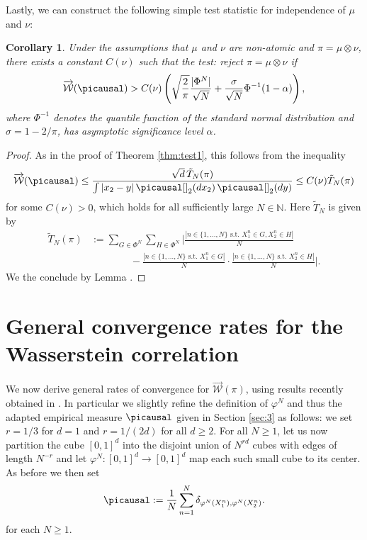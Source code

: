 \documentclass[10pt]{amsart}
\newtheorem{corollary}[theorem]{Corollary}
\newcommand{\N}{\mathbb{N}}
\begin{document}
Lastly, we can construct the following simple test statistic for independence of $\mu$ and $\nu$:

\begin{corollary}\label{cor:go}
Under the assumptions that $\mu$ and $\nu$ are non-atomic and $\pi=\mu\otimes\nu$, there exists a constant $C(\nu)$ such that the test: reject $\pi=\mu\otimes \nu$ if 
\begin{align*}
\overrightarrow{\mathcal{W}}(\picausal)> C(\nu)\left( \sqrt{\frac{2}{\pi}} \frac{|\Phi^N|}{\sqrt{N}}+\frac{\sigma}{\sqrt{N}} \Phi^{-1}(1-\alpha)\right),
\end{align*}
where $\Phi^{-1}$ denotes the quantile function of the standard normal distribution and $\sigma=1-2/\pi$, has asymptotic significance level $\alpha$.
\end{corollary}

\begin{proof}
As in the proof of Theorem \ref{thm:test1}, this follows from the inequality
\begin{align*}
\overrightarrow{\mathcal{W}}(\picausal)\le \frac{\sqrt{d}\, \tilde{T}_N(\pi)}{ \int |x_2-y|\,\picausal[]_2(dx_2)\,\picausal[]_2(dy)}\le C(\nu) \tilde{T}_N(\pi)
\end{align*}
for some $C(\nu)>0$, which holds for all sufficiently large $N\in \N$. Here $\tilde{T}_N$ is given by 
\begin{align*}
\tilde{T}_N(\pi)&:=
\sum_{G\in \Phi^N} \sum_{H\in\Phi^N} \Bigg|\frac{|n\in \{1,\dots, N\} \text{ s.t. } X_1^n\in G, X_2^n\in H|}{N}\\
&\qquad\qquad- \frac{|n\in \{1, \dots, N\} \text{ s.t. } X_1^n\in G|}{N}\cdot \frac{|n\in \{1,\dots, N\} \text{ s.t. } X_2^n\in H|}{N}\Bigg|.
\end{align*}
We the conclude by Lemma \cite[Lemma 1.1]{jwb}. 
\end{proof}

\section{General convergence rates for the Wasserstein correlation}\label{sec:5}

We now derive general rates of convergence for $\overrightarrow{\mathcal{W}}(\pi)$, using results recently obtained in \cite{backhoff2020estimating}. In particular we slightly refine the definition of $\varphi^N$ and thus the adapted empirical measure $\picausal$ given in Section \ref{sec:3} as follows: we set $r=1/3$ for $d=1$ and $r=1/(2d)$ for all $d\geq 2$.
	For all $N\geq 1$, let us  now partition the cube $[0,1]^d$ into the disjoint union of $N^{rd}$ cubes with edges of length $N^{-r}$ and let $\varphi^N\colon[0,1]^d\to[0,1]^d$ map each such small cube to its center. As before we then set
	\[ \picausal:=\frac{1}{N}\sum_{n=1}^N \delta_{\varphi^N(X_1^n),\varphi^N(X_2^n)}. \]
	for each $N\geq 1$. 
\end{document}
